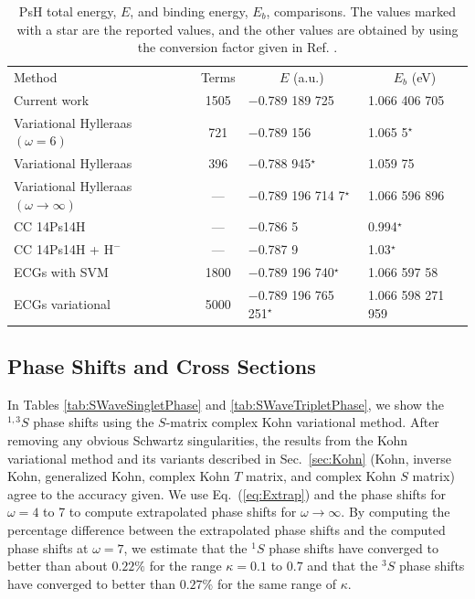 \documentclass[preprint,showpacs,showkeys,preprintnumbers,amsmath,amssymb,longbibliography,pra,aps]{revtex4-1}
\newcommand*{\thead}[1]{\multicolumn{1}{c}{#1}}
\begin{document}
{\squeezetable  %
\begin{table}
\begin{center}
\begin{ruledtabular}  %
\begin{tabular}{l c l l}
Method & Terms & \thead{$E$ (a.u.)} & \thead{$E_b$ (eV)}\\
\colrule
Current work & 1505 & $-$0.789 189 725 & 1.066 406 705 \\
Variational Hylleraas $(\omega = 6)$ \cite{VanReeth2003} & 721 & $-$0.789 156 & 1.065 5$^\star$ \\
Variational Hylleraas \cite{Ho1986} & 396 & $-$0.788 945$^\star$ & 1.059 75 \\
Variational Hylleraas $(\omega \rightarrow \infty)$ \cite{Yan1999} & --- & $-$0.789 196 714 7$^\star$ & 1.066 596 896 \\
CC 14Ps14H \cite{Blackwood2002} & --- & $-$0.786 5 & 0.994$^\star$ \\
CC 14Ps14H + $\text{H}^-$ \cite{Walters2004} & --- & $-$0.787 9 & 1.03$^\star$\\
ECGs with SVM \cite{Mitroy2006} & 1800 & $-$0.789 196 740$^\star$ & 1.066 597 58 \\
ECGs variational \cite{Bubin2006} & 5000 & $-$0.789 196 765 251$^\star$ & 1.066 598 271 959 \\
\end{tabular}
\end{ruledtabular}
\caption{PsH total energy, $E$, and binding energy, $E_b$, comparisons.
The values marked with a star are the
reported values, and the other values are obtained by using the conversion
factor given in Ref. \cite{Mohr2012,*NISTConversions}.}
\label{tab:BoundEnergy}
\end{center}
\end{table}

\subsection{Phase Shifts and Cross Sections}
\label{sec:PhaseCross}

In Tables \ref{tab:SWaveSingletPhase} and \ref{tab:SWaveTripletPhase}, we 
show the $^{1,3}S$ phase shifts using the $S$-matrix complex Kohn 
variational method. After removing any obvious Schwartz singularities, the
results from the Kohn variational method and its variants
described in Sec.~\ref{sec:Kohn} (Kohn, inverse Kohn, generalized Kohn,
complex Kohn $T$ matrix, and complex Kohn $S$ matrix) agree
to the accuracy given.
We use Eq.~(\ref{eq:Extrap}) and the phase shifts for $\omega = 4$ to 7 to
compute extrapolated phase shifts for $\omega \rightarrow \infty$.
By computing the percentage difference between the
extrapolated phase shifts and the computed phase shifts at $\omega=7$, we
estimate that the $^1S$ phase shifts have converged to better than about
$0.22\%$ for the range $\kappa=0.1$ to $0.7$ and that the $^3S$ phase shifts
have converged to better than $0.27\%$ for the same range of $\kappa$.

}
\end{document}
